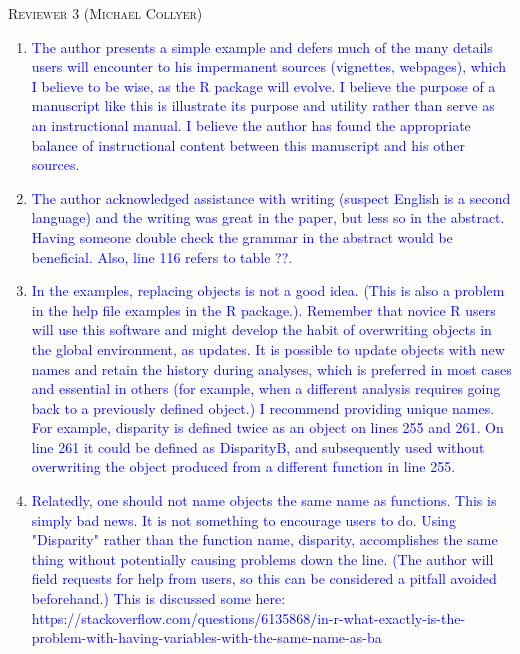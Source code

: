 \documentclass[12pt,letterpaper]{article}
\renewcommand{\section}[1]{%
\bigskip
\begin{center}
\begin{Large}
\normalfont\scshape #1
\medskip
\end{Large}
\end{center}}
\begin{document}
%
%






\section{Reviewer 3 (Michael Collyer)}

\begin{enumerate}

\item{\textcolor{blue}{The author presents a simple example and defers much of the many details users will encounter to his impermanent sources (vignettes, webpages), which I believe to be wise, as the R package will evolve.  I believe the purpose of a manuscript like this is illustrate its purpose and utility rather than serve as an instructional manual.  I believe the author has found the appropriate balance of instructional content between this manuscript and his other sources.}}


\item{\textcolor{blue}{The author acknowledged assistance with writing (suspect English is a second language) and the writing was great in the paper, but less so in the abstract.  Having someone double check the grammar in the abstract would be beneficial.  Also, line 116 refers to table ??.}}

\item{\textcolor{blue}{In the examples, replacing objects is not a good idea.  (This is also a problem in the help file examples in the R package.).  Remember that novice R users will use this software and might develop the habit of overwriting objects in the global environment, as updates.  It is possible to update objects with new names and retain the history during analyses, which is preferred in most cases and essential in others (for example, when a different analysis requires going back to a previously defined object.)  I recommend providing unique names.  For example, disparity is defined twice as an object on lines 255 and 261.  On line 261 it could be defined as DisparityB, and subsequently used without overwriting the object produced from a different function in line 255.}}


\item{\textcolor{blue}{Relatedly, one should not name objects the same name as functions.  This is simply bad news.  It is not something to encourage users to do.  Using "Disparity" rather than the function name, disparity, accomplishes the same thing without potentially causing problems down the line.  (The author will field requests for help from users, so this can be considered a pitfall avoided beforehand.)  This is discussed some here: https://stackoverflow.com/questions/6135868/in-r-what-exactly-is-the-problem-with-having-variables-with-the-same-name-as-ba}}


\end{enumerate}
\end{document}
